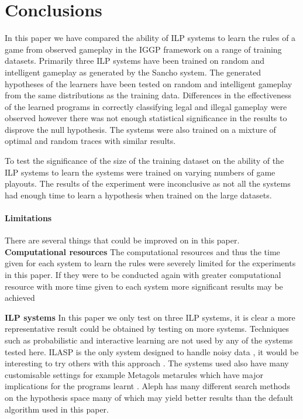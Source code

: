 \chapter{Conclusions}
In this paper we have compared the ability of ILP systems to learn the rules of a game from observed gameplay in the IGGP framework on a range of training datasets. Primarily three ILP systems have been trained on random and intelligent gameplay as generated by the Sancho system. The generated hypotheses of the learners have been tested on random and intelligent gameplay from the same distributions as the training data. Differences in the effectiveness of the learned programs in correctly classifying legal and illegal gameplay were observed however there was not enough statistical significance in the results to disprove the null hypothesis. The systems were also trained on a mixture of optimal and random traces with similar results.

To test the significance of the size of the training dataset on the ability of the ILP systems to learn the systems were trained on varying numbers of game playouts. The results of the experiment were inconclusive as not all the systems had enough time to learn a hypothesis when trained on the large datasets.


\subsubsection{Limitations}
There are several things that could be improved on in this paper.
\\

\textbf{Computational resources}
The computational resources and thus the time given for each system to learn the rules were severely limited for the experiments in this paper. If they were to be conducted again with greater computational resource with more time given to each system more significant results may be achieved

\textbf{ILP systems} In this paper we only test on three ILP systems, it is clear a more representative result could be obtained by testing on more systems. Techniques such as probabilistic \cite{Bellodi/Probablistic,Raedt/Probabalistic} and interactive \cite{Raedt/Interactive} learning are not used by any of the systems tested here. ILASP is the only system designed to handle noisy data \cite{MarkLaw/ILASP2i}, it would be interesting to try others with this approach \cite{Oblak/Noise,Evans/Noise}. The systems used also have many customisable settings for example Metagols metarules which have major implications for the programs learnt \cite{Cropper/Metarules}. Aleph has many different search methods on the hypothesis space many of which may yield better results than the default algorithm used in this paper.

